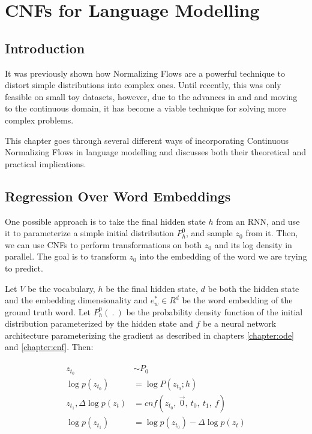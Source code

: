 \chapter{CNFs for Language Modelling}
\label{chapter:cnf_lm}

\section{Introduction}
\label{section:cnf_lm:introduction}

It was previously shown how Normalizing Flows are a powerful technique to distort simple distributions into complex ones. Until recently, this was only feasible on small toy datasets, however, due to the advances in \citet{chen2018neural} and \citet{grathwohl2018ffjord} and moving to the continuous domain, it has become a viable technique for solving more complex problems.

This chapter goes through several different ways of incorporating Continuous Normalizing Flows in language modelling and discusses both their theoretical and practical implications.


\section{Regression Over Word Embeddings}
\label{section:cnf_lm:regression}

One possible approach is to take the final hidden state $ h $ from an RNN, and use it to parameterize a simple initial distribution $ P_h^0 $, and sample $ z_0 $ from it. Then, we can use CNFs to perform transformations on both $ z_0 $ and its log density in parallel. The goal is to transform $ z_0 $ into the embedding of the word we are trying to predict.

Let $ V $ be the vocabulary, $ h $ be the final hidden state, $ d $ be both the hidden state and the embedding dimensionality and $ e_w^* \in R^{d} $ be the word embedding of the ground truth word. Let $ P_h^0( \ . \ ) $ be the probability density function of the initial distribution parameterized by the hidden state and $ f $ be a neural network architecture parameterizing the gradient as described in chapters \ref{chapter:ode} and \ref{chapter:cnf}. Then:

\begin{align}
    \label{equation:cnf_lm:regression:regression_word_embedding}
    \begin{split}
        z_{t_0} &\sim P_0 \\
        \log p(z_{t_0}) &= \log P(z_{t_0}; h) \\
        z_{t_1}, \Delta \log p (z_t) &= cnf(z_{t_0}, \ \vec{0}, \ t_0 , \ t_1 , \ f) \\
        \log p (z_{t_1}) &= \log p(z_{t_0}) -  \Delta \log  p (z_t)
    \end{split}
\end{align}

